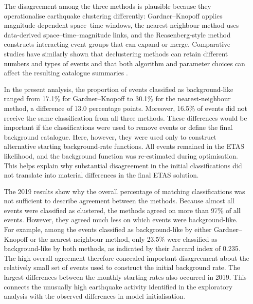 The disagreement among the three methods is plausible because they
operationalise earthquake clustering differently: Gardner--Knopoff applies
magnitude-dependent space--time windows, the nearest-neighbour method uses
data-derived space--time--magnitude links, and the Reasenberg-style method
constructs interacting event groups that can expand or merge. Comparative
studies have similarly shown that declustering methods can retain different
numbers and types of events and that both algorithm and parameter choices can
affect the resulting catalogue summaries
\citep{perry2024comparative,mizrahi2021effect}.

In the present analysis, the proportion of events classified as
background-like ranged from 17.1\% for Gardner--Knopoff to 30.1\% for the
nearest-neighbour method, a difference of 13.0 percentage points. Moreover,
16.5\% of events did not receive the same classification from all three
methods. These differences would be important if the classifications were
used to remove events or define the final background catalogue. Here,
however, they were used only to construct alternative starting
background-rate functions. All events remained in the ETAS likelihood, and
the background function was re-estimated during optimisation. This helps
explain why substantial disagreement in the initial classifications did not
translate into material differences in the final ETAS solution.

The 2019 results show why the overall percentage of matching classifications
was not sufficient to describe agreement between the methods. Because almost
all events were classified as clustered, the methods agreed on more than
97\% of all events. However, they agreed much less on which events were
background-like. For example, among the events classified as background-like
by either Gardner--Knopoff or the nearest-neighbour method, only 23.5\% were
classified as background-like by both methods, as indicated by their Jaccard
index of 0.235. The high overall agreement therefore concealed important
disagreement about the relatively small set of events used to construct the
initial background rate. The largest differences between the monthly
starting rates also occurred in 2019. This connects the unusually high
earthquake activity identified in the exploratory analysis with the observed
differences in model initialisation.

